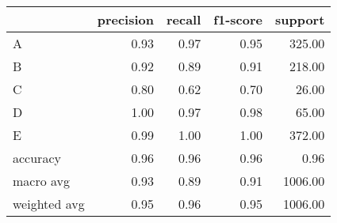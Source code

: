 \begin{tabular}{|l|r|r|r|r|}
\hline
{} &  precision &  recall &  f1-score &  support \\
\hline
A            &       0.93 &    0.97 &      0.95 &   325.00 \\
B            &       0.92 &    0.89 &      0.91 &   218.00 \\
C            &       0.80 &    0.62 &      0.70 &    26.00 \\
D            &       1.00 &    0.97 &      0.98 &    65.00 \\
E            &       0.99 &    1.00 &      1.00 &   372.00 \\
accuracy     &       0.96 &    0.96 &      0.96 &     0.96 \\
macro avg    &       0.93 &    0.89 &      0.91 &  1006.00 \\
weighted avg &       0.95 &    0.96 &      0.95 &  1006.00 \\
\hline
\end{tabular}
